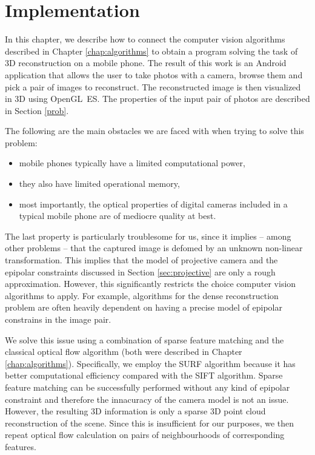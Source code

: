 \chapter{Implementation}
\label{chap:implementation}

In this chapter, we describe how to connect the computer vision algorithms described in Chapter \ref{chap:algorithms} to obtain a program solving the task of 3D reconstruction on a mobile phone. 
The result of this work is an Android application that allows the user to take photos with a camera, browse them and pick a pair of images to reconstruct. 
The reconstructed image is then visualized in 3D using OpenGL~ES.
The properties of the input pair of photos are described in Section \ref{prob}.

The following are the main obstacles we are faced with when trying to solve this problem: 
\begin{itemize}
\item mobile phones typically have a limited computational power, 
\item they also have limited operational memory, 
\item most importantly, the optical properties of digital cameras included in a typical mobile phone are of mediocre quality at best. 
\end{itemize} 
The last property is particularly troublesome for us, since it implies -- among other problems -- that the captured image is defomed by an unknown non-linear transformation. 
This implies that the model of projective camera and the epipolar constraints discussed in Section \ref{sec:projective} are only a rough approximation. 
However, this significantly restricts the choice computer vision algorithms to apply. 
For example, algorithms for the dense reconstruction problem are often heavily dependent on having a precise model of epipolar constrains in the image pair. 

We solve this issue using a combination of sparse feature matching and the classical optical flow algorithm (both were described in Chapter \ref{chap:algorithms}). 
Specifically, we employ the SURF algorithm because it has better computational efficiency compared with the SIFT algorithm.
Sparse feature matching can be successfully performed without any kind of epipolar constraint and therefore the innacuracy of the camera model is not an issue. 
However, the resulting 3D information is only a sparse 3D point cloud reconstruction of the scene. 
Since this is insufficient for our purposes, we then repeat optical flow calculation on pairs of neighbourhoods of corresponding features. 

